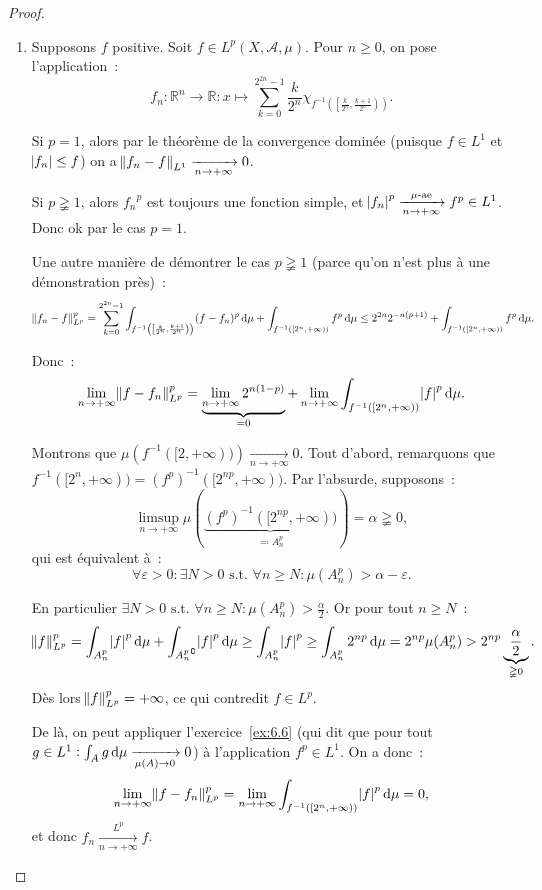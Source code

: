 \documentclass{article}
\newcommand{\pinfty}{{+\infty}}
\newcommand{\st}{\text{ s.t. }}
\newcommand{\C}{\complement}
\newcommand{\R}{{\mathbb R}}
\begin{document}
\begin{proof}~
\begin{enumerate}
	\item Supposons $f$ positive. Soit $f \in L^p(X, \mathcal A, \mu)$. Pour $n \geq 0$, on pose l'application~:
	\[f_n : \R^n \to \R : x \mapsto \sum_{k=0}^{2^{2n}-1}\frac k{2^n}\chi_{f^{-1}\left(\left[\frac k{2^n}, \frac {k+1}{2^n}\right)\right)}.\]

	Si $p=1$, alors par le théorème de la convergence dominée (puisque $f \in L^1$ et $\abs {f_n} \leq f$) on a $\norm {f_n-f}_{L^1} \xrightarrow[n \to \pinfty]{} 0$.

	Si $p \gneqq 1$, alors ${f_n}^p$ est toujours une fonction simple, et $\abs {f_n}^p \xrightarrow[n \to \pinfty]{\mu\text{-ae}} f^p \in L^1$. Donc ok par le cas $p=1$.

	Une autre manière de démontrer le cas $p \gneqq 1$ (parce qu'on n'est plus à une démonstration près)~:
	\[\norm {f_n-f}_{L^p}^p = \sum_{k=0}^{2^{2n}-1}\int_{f^{-1}\left(\left[\frac k{2^n}, \frac {k+1}{2^n}\right)\right)}(f-f_n)^p\dif\mu + \int_{f^{-1}([2^n, \pinfty))}f^p\dif\mu
		\leq 2^{2n}2^{-n(p+1)} + \int_{f^{-1}([2^n, \pinfty))}f^p\dif\mu.\]

	Donc~:
	\[\lim_{n \to \pinfty}\norm {f-f_n}_{L^p}^p = \underbrace {\lim_{n \to \pinfty}2^{n(1-p)}}_{= 0} + \lim_{n \to \pinfty}\int_{f^{-1}([2^n, \pinfty))}\abs f^p\dif\mu.\]

	Montrons que $\mu\left(f^{-1}([2, \pinfty))\right) \xrightarrow[n \to \pinfty]{} 0$. Tout d'abord, remarquons que $f^{-1}([2^n, \pinfty)) = (f^p)^{-1}([2^{np}, \pinfty))$.
	Par l'absurde, supposons~:
	\[\limsup_{n \to \pinfty}\mu\left(\underbrace {(f^p)^{-1}([2^{np}, \pinfty))}_{\eqqcolon A_n^p}\right) = \alpha \gneqq 0,\]
	qui est équivalent à~:
	\[\forall \varepsilon > 0 : \exists N > 0 \st \forall n \geq N : \mu(A_n^p) > \alpha-\varepsilon.\]

	En particulier $\exists N > 0 \st \forall n \geq N : \mu(A_n^p) > \frac \alpha2$. Or pour tout $n \geq N$~:
	\[\norm f_{L^p}^p = \int_{A_n^p}\abs f^p\dif\mu + \int_{{A_n^p}^\C}\abs f^p\dif\mu \geq \int_{A_n^p}\abs f^p \geq \int_{A_n^p}2^{np}\dif\mu = 2^{np}\mu(A_n^p)
	> 2^{np}\underbrace {\frac \alpha2}_{\gneqq 0}.\]
	Dès lors $\norm f_{L^p}^p = \pinfty$, ce qui contredit $f \in L^p$.

	De là, on peut appliquer l'exercice~\ref{ex:6.6} (qui dit que pour tout $g \in L^1 : \int_Ag\dif\mu \xrightarrow[\mu(A) \to 0]{} 0$) à l'application
	$f^p \in L^1$. On a donc~:
	\[\lim_{n \to \pinfty}\norm {f-f_n}_{L^p}^p = \lim_{n \to \pinfty}\int_{f^{-1}([2^n, \pinfty))}\abs f^p\dif\mu = 0,\]
	et donc $f_n \xrightarrow[n \to \pinfty]{L^p} f$.


\end{enumerate}
\end{proof}
\end{document}
